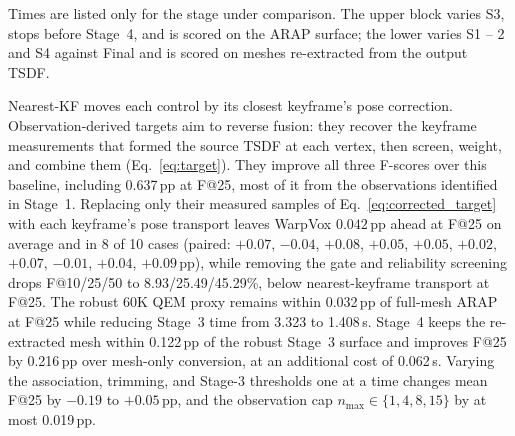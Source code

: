 \begin{table}[t]
\centering
\caption{\textbf{Ablation of Stages~1 -- 4 on ten Kimera-Multi cases.}}
\label{tab:ablation}
\scriptsize
\setlength{\tabcolsep}{2pt}
\parbox{\columnwidth}{\vspace{2pt}\scriptsize Times are listed only for the
stage under comparison. The upper block varies S3, stops before Stage~4, and
is scored on the ARAP surface; the lower varies S1 -- 2 and S4 against Final
and is scored on meshes re-extracted from the output TSDF.}
\end{table}

Nearest-KF moves each control by its closest keyframe's pose correction.
Observation-derived targets aim to reverse fusion: they recover the keyframe
measurements that formed the source TSDF at each vertex, then screen, weight,
and combine them (Eq.~\eqref{eq:target}). They improve all three F-scores over
this baseline, including 0.637\,pp at F@25, most of it from the
observations identified in Stage~1. Replacing only
their measured samples of Eq.~\eqref{eq:corrected_target} with each keyframe's
pose transport leaves WarpVox $0.042$\,pp ahead at F@25 on
average and in 8 of 10 cases (paired: $+0.07$, $-0.04$, $+0.08$, $+0.05$, $+0.05$, $+0.02$, $+0.07$, $-0.01$, $+0.04$, $+0.09$\,pp), while removing the gate
and reliability screening drops F@10/25/50 to 8.93/25.49/45.29\%, below
nearest-keyframe transport at F@25. The robust 60K QEM proxy remains within 0.032\,pp
of full-mesh ARAP at F@25 while reducing Stage~3 time from 3.323 to
1.408\,s. Stage~4 keeps the re-extracted mesh within 0.122\,pp of the robust
Stage~3 surface and improves F@25 by 0.216\,pp over mesh-only conversion, at
an additional cost of 0.062\,s. Varying the association, trimming, and Stage-3
thresholds one at a time changes mean F@25 by $-0.19$ to $+0.05$\,pp, and
the observation cap $n_{\max}\in\{1,4,8,15\}$ by at most 0.019\,pp.

